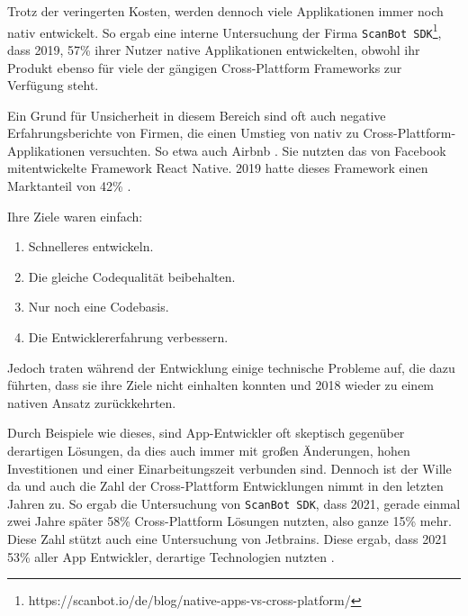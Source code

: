 Trotz der veringerten Kosten, werden dennoch viele Applikationen immer noch nativ entwickelt. So ergab eine interne Untersuchung der Firma \verb|ScanBot SDK|\footnote{https://scanbot.io/de/blog/native-apps-vs-cross-platform/}, dass 2019, 57\% ihrer Nutzer native Applikationen entwickelten, obwohl ihr Produkt ebenso für viele der gängigen Cross-Plattform Frameworks zur Verfügung steht.

Ein Grund für Unsicherheit in diesem Bereich sind oft auch negative Erfahrungsberichte von Firmen, die einen Umstieg von nativ zu Cross-Plattform-Applikationen versuchten.  So etwa auch Airbnb \cite{Airbnb_react_goals}. Sie nutzten das von Facebook mitentwickelte Framework React Native. 2019 hatte dieses Framework einen Marktanteil von 42\% \cite{statist_CP_Framework}. 

Ihre Ziele waren einfach:
\begin{enumerate}
    \item Schnelleres entwickeln.
    \item Die gleiche Codequalität beibehalten.
    \item Nur noch eine Codebasis.
    \item Die Entwicklererfahrung verbessern.
\end{enumerate}
Jedoch traten während der Entwicklung einige technische Probleme auf, die dazu führten, dass sie ihre Ziele nicht einhalten konnten und 2018 wieder zu einem nativen Ansatz zurückkehrten.

Durch Beispiele wie dieses, sind App-Entwickler oft skeptisch gegenüber derartigen Lösungen, da dies auch immer mit großen Änderungen, hohen Investitionen und einer  Einarbeitungszeit verbunden sind. Dennoch ist der Wille da und auch die Zahl der Cross-Plattform Entwicklungen nimmt in den letzten Jahren zu. So ergab die Untersuchung von \verb|ScanBot SDK|, dass 2021, gerade einmal zwei Jahre später 58\% Cross-Plattform Lösungen nutzten, also ganze 15\% mehr. Diese Zahl stützt auch eine Untersuchung von Jetbrains. Diese ergab, dass 2021 53\% aller App Entwickler, derartige Technologien nutzten \cite{JetBrains_miscellaneous_2021}.

